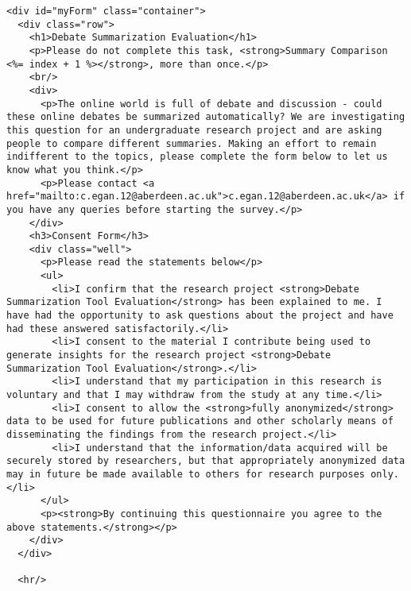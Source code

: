 \documentclass{article}
\begin{document}
\begin{verbatim}
<div id="myForm" class="container">
  <div class="row">
    <h1>Debate Summarization Evaluation</h1>
    <p>Please do not complete this task, <strong>Summary Comparison <%= index + 1 %></strong>, more than once.</p>
    <br/>
    <div>
      <p>The online world is full of debate and discussion - could these online debates be summarized automatically? We are investigating this question for an undergraduate research project and are asking people to compare different summaries. Making an effort to remain indifferent to the topics, please complete the form below to let us know what you think.</p>
      <p>Please contact <a href="mailto:c.egan.12@aberdeen.ac.uk">c.egan.12@aberdeen.ac.uk</a> if you have any queries before starting the survey.</p>
    </div>
    <h3>Consent Form</h3>
    <div class="well">
      <p>Please read the statements below</p>
      <ul>
        <li>I confirm that the research project <strong>Debate Summarization Tool Evaluation</strong> has been explained to me. I have had the opportunity to ask questions about the project and have had these answered satisfactorily.</li>
        <li>I consent to the material I contribute being used to generate insights for the research project <strong>Debate Summarization Tool Evaluation</strong>.</li>
        <li>I understand that my participation in this research is voluntary and that I may withdraw from the study at any time.</li>
        <li>I consent to allow the <strong>fully anonymized</strong> data to be used for future publications and other scholarly means of disseminating the findings from the research project.</li>
        <li>I understand that the information/data acquired will be securely stored by researchers, but that appropriately anonymized data may in future be made available to others for research purposes only.</li>
      </ul>
      <p><strong>By continuing this questionnaire you agree to the above statements.</strong></p>
    </div>
  </div>

  <hr/>


\end{verbatim}
\end{document}
